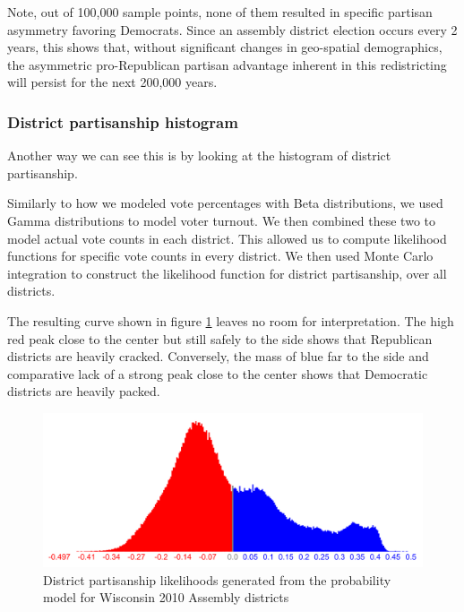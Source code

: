\documentclass[preprint,12pt]{article}
\begin{document}
Note, out of 100,000 sample points, none of them resulted in specific partisan asymmetry favoring Democrats.  Since an assembly district election occurs every 2 years, this shows that, without significant changes in geo-spatial demographics, the asymmetric pro-Republican partisan advantage inherent in this redistricting will persist for the next 200,000 years.

\subsubsection{District partisanship histogram}
 
Another way we can see this is by looking at the histogram of district partisanship.
 
Similarly to how we modeled vote percentages with Beta distributions, we used Gamma distributions to model voter turnout.  We then combined these two to model actual vote counts in each district.  This allowed us to compute likelihood functions for specific vote counts in every district.  We then used Monte Carlo integration to construct the likelihood function for district partisanship, over all districts.
 
The resulting curve shown in figure \ref{fig:LikelihoodsDistrictPartisanship} leaves no room for interpretation.  The high red peak close to the center but still safely to the side shows that Republican districts are heavily cracked.  Conversely, the mass of blue far to the side and comparative lack of a strong peak close to the center shows that Democratic districts are heavily packed.
 
\begin{figure}[htb!]
    \begin{center}
        \includegraphics[scale=0.25]{../Figures/WI2010/district_partisanship_cropped.png}
        \caption{District partisanship likelihoods generated from the probability model for Wisconsin 2010 Assembly districts}\label{fig:LikelihoodsDistrictPartisanship}
    \end{center}
\end{figure}
\end{document}
